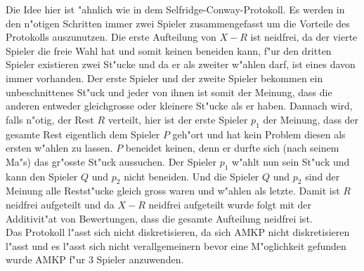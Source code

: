\documentclass[11pt, a4paper, twoside]{article}
\numberwithin{equation}{section}
\begin{document}
\newline
\newline
Die Idee hier ist "ahnlich wie in dem Selfridge-Conway-Protokoll. Es werden in den n"otigen Schritten immer zwei Spieler zusammengefasst um die Vorteile des Protokolls auszunutzen. Die erste Aufteilung von $X-R$ ist neidfrei, da der vierte Spieler die freie Wahl hat und somit keinen beneiden kann, f"ur den dritten Spieler existieren zwei St"ucke und da er als zweiter w"ahlen darf, ist eines davon immer vorhanden. Der erste Spieler und der zweite Spieler bekommen ein unbeschnittenes St"uck und jeder von ihnen ist somit der Meinung, dass die anderen entweder gleichgrosse oder kleinere St"ucke als er haben. Dannach wird, falls n"otig, der Rest $R$ verteilt, hier ist der erste Spieler $p_1$ der Meinung, dass der gesamte Rest eigentlich dem Spieler $P$ geh"ort und hat kein Problem diesen als ersten w"ahlen zu lassen. $P$ beneidet keinen, denn er durfte sich (nach seinem Ma"s) das gr"osste St"uck aussuchen. Der Spieler $p_1$ w"ahlt nun sein St"uck und kann den Spieler $Q$ und $p_2$ nicht beneiden. Und die Spieler $Q$ und $p_2$ sind der Meinung alle Restst"ucke gleich gross waren und w"ahlen als letzte. Damit ist $R$ neidfrei aufgeteilt und da $X-R$ neidfrei aufgeteilt wurde folgt mit der Additivit"at von Bewertungen, dass die gesamte Aufteilung neidfrei ist.\\ Das Protokoll l"asst sich nicht diskretisieren, da sich AMKP nicht diskretisieren l"asst und es l"asst sich nicht verallgemeinern bevor eine M"oglichkeit gefunden wurde AMKP f"ur 3 Spieler anzuwenden.
\end{document}
